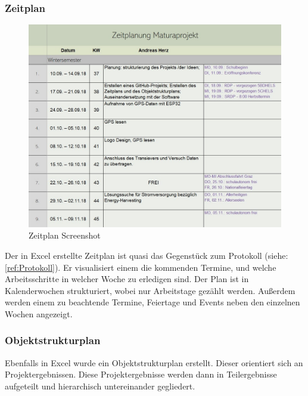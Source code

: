         \subsubsection{Zeitplan}
        \begin{figure}[H]
            \centering
            \includegraphics[width=1\textwidth]{./media/images/Zeitplan.jpg}
            \caption{Zeitplan Screenshot}
            \label{fig:Zeitplan}
        \end{figure}
        
        Der in Excel erstellte Zeitplan ist quasi das Gegenstück zum Protokoll (siehe: \ref{ref:Protokoll}). Er visualisiert einem die kommenden Termine, und welche Arbeitsschritte in welcher Woche zu erledigen sind. Der Plan ist in Kalenderwochen strukturiert, wobei nur Arbeitstage gezählt werden. Außerdem werden einem zu beachtende Termine, Feiertage und Events neben den einzelnen Wochen angezeigt.
        
\pagebreak
        
        \subsubsection{Objektstrukturplan}\label{ref:Objektstrukt}
        
        Ebenfalls in Excel wurde ein Objektstrukturplan erstellt. Dieser orientiert sich an Projektergebnissen. Diese Projektergebnisse werden dann in Teilergebnisse aufgeteilt und hierarchisch untereinander gegliedert. 
        
